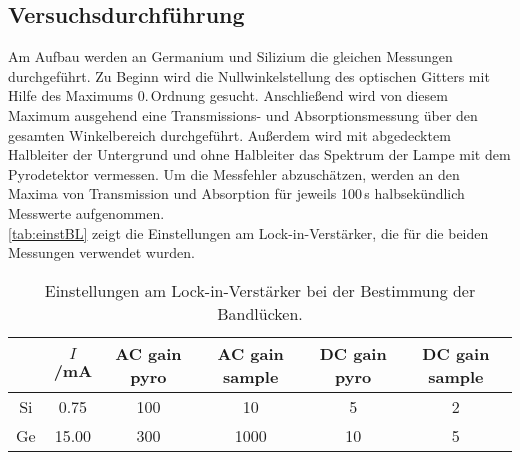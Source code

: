 \subsection{Versuchsdurchführung}

Am Aufbau werden an Germanium und Silizium die gleichen Messungen durchgeführt.
Zu Beginn wird die Nullwinkelstellung des optischen Gitters mit Hilfe des Maximums 0.\,Ordnung gesucht.
Anschließend wird von diesem Maximum ausgehend eine Trans\-missions- und Absorptionsmessung
über den gesamten Winkelbereich durchgeführt.
Außerdem wird mit abgedecktem Halbleiter der Untergrund und ohne Halbleiter das Spektrum der Lampe
mit dem Pyrodetektor vermessen.
Um die Messfehler abzuschätzen, werden an den Maxima von Transmission und Absorption für jeweils 100\,s
halbsekündlich Messwerte aufgenommen.\\
\autoref{tab:einstBL} zeigt die Einstellungen am Lock-in-Verstärker, die für die beiden Messungen verwendet wurden.


\begin{table}[H]
\caption{Einstellungen am Lock-in-Verstärker bei der Bestimmung der Bandlücken.}
\begin{center}
\begin{tabular}{|c|c|c|c|c|c|}
\hline
			&	$I$/mA	&	AC gain pyro	&	AC gain sample	&	DC gain pyro	&	DC gain sample	\\ \hline
Si			&	0.75	&	100				&	10				&	5				&	2				\\ \hline
Ge			&	15.00	&	300				&	1000			&	10				&	5				\\ \hline
\end{tabular}
\end{center}
\label{tab:einstBL}
\end{table}